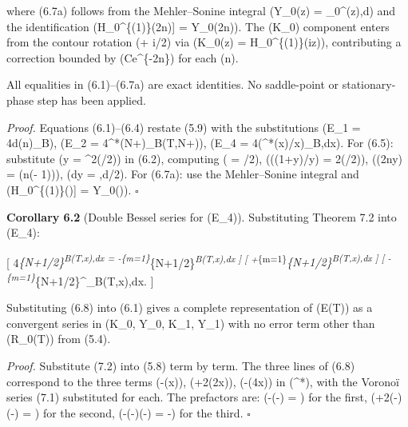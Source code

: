 \documentclass[
]{article}
\begin{document}
where (6.7a) follows from the Mehler--Sonine integral (Y\_0(z) =
\int\_0\^{}\infty \sin(z\cosh\theta),d\theta) and the
identification (\mathrm{Im}{[}H\_0\^{}\{(1)\}(2\pi n\cosh\theta){]} =
Y\_0(2\pi n\cosh\theta)). The (K\_0) component enters from the contour
rotation (\theta \to \theta + i\pi/2) via (K\_0(z) =
H\_0\^{}\{(1)\}(iz)), contributing a correction bounded
by (Ce\^{}\{-2\pi n\}) for each (n).

All equalities in (6.1)--(6.7a) are exact identities. No saddle-point or
stationary-phase step has been applied.

\emph{Proof.} Equations (6.1)--(6.4) restate (5.9) with the
substitutions (E\_1 = 4\sum d(n)\Psi\_B), (E\_2 =
4\Delta\^{}*(N+)\Psi\_B(T,N+)), (E\_4 =
4\int(\Delta\^{}*(x)/x)\Xi\_B,dx). For (6.5): substitute (y =
\sinh\^{}2(\theta/2)) in (6.2), computing ( =
\sinh\theta/2), (\log((1+y)/y) = 2\log\coth(\theta/2)), (\cos(2\pi ny) =
\cos(\pi n(\cosh\theta - 1))), (dy = \sinh\theta,d\theta/2). For (6.7a):
use the Mehler--Sonine integral and
(\mathrm{Im}{[}H\_0\^{}\{(1)\}(\cdot){]} = Y\_0(\cdot)). \(\square\)

\textbf{Corollary 6.2} (Double Bessel series for (E\_4)). Substituting
Theorem 7.2 into (E\_4):

{[}
4\int\emph{\{N+1/2\}\textsuperscript{\infty {}\Xi\emph{B(T,x),dx
=
-\sum}\{m=1\}}\infty {}\int}\{N+1/2\}\textsuperscript{\infty {}\Xi\emph{B(T,x),dx
{]} {[}
+\sum}\{m=1\}}\infty {}\int\emph{\{N+1/2\}\textsuperscript{\infty {}\Xi\emph{B(T,x),dx
{]} {[}
-\sum}\{m=1\}}\infty {}\int}\{N+1/2\}\^{}\infty {}\Xi\_B(T,x),dx.
 {]}

Substituting (6.8) into (6.1) gives a complete representation of (E(T))
as a convergent series in (K\_0, Y\_0, K\_1, Y\_1) with no error term
other than (R\_0(T)) from (5.4).

\emph{Proof.} Substitute (7.2) into (5.8) term by term. The three lines
of (6.8) correspond to the three terms (-\Delta(x)), (+2\Delta(2x)),
(-\Delta(4x)) in (\Delta\^{}*), with the Voronoï series
(7.1) substituted for each. The prefactors are:
(-(-)\cdot{} = )
for the first,
(+2\cdot(-)\cdot(-) =
) for the second,
(-(-)\cdot(-)\cdot{} =
-) for the third. \(\square\)
\end{document}
